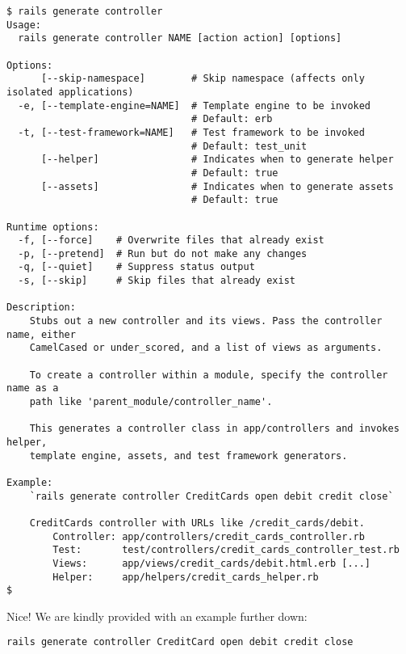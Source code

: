 \documentclass[a4paper]{book}
\begin{document}
\begin{shaded}\begin{verbatim}
$ rails generate controller
Usage:
  rails generate controller NAME [action action] [options]

Options:
      [--skip-namespace]        # Skip namespace (affects only isolated applications)
  -e, [--template-engine=NAME]  # Template engine to be invoked
                                # Default: erb
  -t, [--test-framework=NAME]   # Test framework to be invoked
                                # Default: test_unit
      [--helper]                # Indicates when to generate helper
                                # Default: true
      [--assets]                # Indicates when to generate assets
                                # Default: true

Runtime options:
  -f, [--force]    # Overwrite files that already exist
  -p, [--pretend]  # Run but do not make any changes
  -q, [--quiet]    # Suppress status output
  -s, [--skip]     # Skip files that already exist

Description:
    Stubs out a new controller and its views. Pass the controller name, either
    CamelCased or under_scored, and a list of views as arguments.

    To create a controller within a module, specify the controller name as a
    path like 'parent_module/controller_name'.

    This generates a controller class in app/controllers and invokes helper,
    template engine, assets, and test framework generators.

Example:
    `rails generate controller CreditCards open debit credit close`

    CreditCards controller with URLs like /credit_cards/debit.
        Controller: app/controllers/credit_cards_controller.rb
        Test:       test/controllers/credit_cards_controller_test.rb
        Views:      app/views/credit_cards/debit.html.erb [...]
        Helper:     app/helpers/credit_cards_helper.rb
$
\end{verbatim}\end{shaded}

Nice! We are kindly provided with an example further down:

\begin{shaded}\begin{verbatim}
rails generate controller CreditCard open debit credit close
\end{verbatim}\end{shaded}
\end{document}
